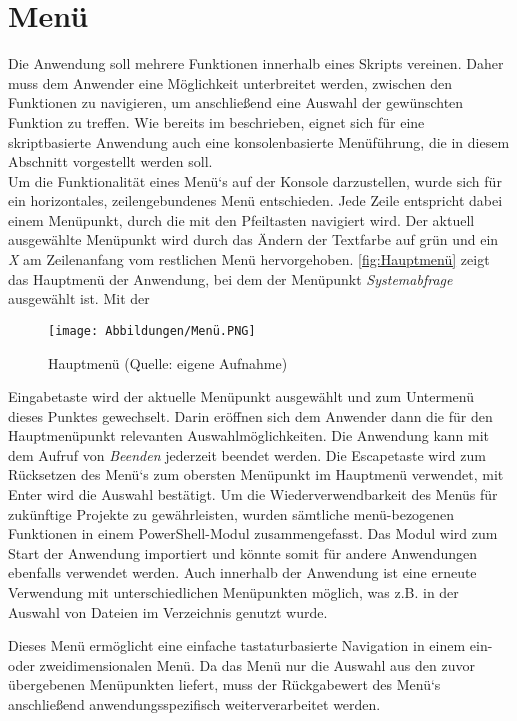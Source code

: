 \section{Menü}\label{sec:menu}
Die Anwendung soll mehrere Funktionen innerhalb eines Skripts vereinen. Daher muss dem Anwender eine Möglichkeit unterbreitet werden, zwischen den Funktionen zu navigieren, um anschließend eine Auswahl der gewünschten Funktion zu treffen. Wie bereits im  beschrieben, eignet sich für eine skriptbasierte Anwendung auch eine konsolenbasierte Menüführung, die in diesem Abschnitt vorgestellt werden soll.\medskip\\
Um die Funktionalität eines Menü`s auf der Konsole darzustellen, wurde sich für ein horizontales, zeilengebundenes Menü entschieden. Jede Zeile entspricht dabei einem Menüpunkt, durch die mit den Pfeiltasten navigiert wird. Der aktuell ausgewählte Menüpunkt wird durch das Ändern der Textfarbe auf grün und ein \textit{X} am Zeilenanfang vom restlichen Menü hervorgehoben. \autoref{fig:Hauptmenü} zeigt das Hauptmenü der Anwendung, bei dem der Menüpunkt \textit{Systemabfrage} ausgewählt ist. Mit der
\begin{wrapfigure}[8]{l}{8 cm}
    \centering
    \texttt{[image: Abbildungen/Menü.PNG]}\caption[Hauptmenü]{Hauptmenü (Quelle: eigene Aufnahme)}
    \label{fig:Hauptmenü}
\end{wrapfigure}
Eingabetaste wird der aktuelle Menüpunkt ausgewählt und zum Untermenü dieses Punktes gewechselt. Darin eröffnen sich dem Anwender dann die für den Hauptmenüpunkt relevanten Auswahlmöglichkeiten. Die Anwendung kann mit dem Aufruf von \textit{Beenden} jederzeit beendet werden. Die Escapetaste wird zum Rücksetzen des Menü`s zum obersten Menüpunkt im Hauptmenü verwendet, mit Enter wird die Auswahl bestätigt. Um die Wiederverwendbarkeit des Menüs für zukünftige Projekte zu gewährleisten, wurden sämtliche menü-bezogenen Funktionen in einem PowerShell-Modul zusammengefasst. Das Modul wird zum Start der Anwendung importiert und könnte somit für andere Anwendungen ebenfalls verwendet werden. Auch innerhalb der Anwendung ist eine erneute Verwendung mit unterschiedlichen Menüpunkten möglich, was z.B. in der Auswahl von Dateien im Verzeichnis genutzt wurde.\medskip\\
 \begin{comment}
 \textbf{speziell konfigurierte Listen?} \textbf{Clear Host nach jedem menüaufruf?}\textbf{Handle Menu und DrawMenu als Unterfunktionen}\\
 \end{comment}
Dieses Menü ermöglicht eine einfache tastaturbasierte Navigation in einem ein- oder zweidimensionalen Menü.
Da das Menü nur die Auswahl aus den zuvor übergebenen Menüpunkten liefert, muss
der Rückgabewert des Menü`s anschließend anwendungsspezifisch weiterverarbeitet werden.
\newpage



